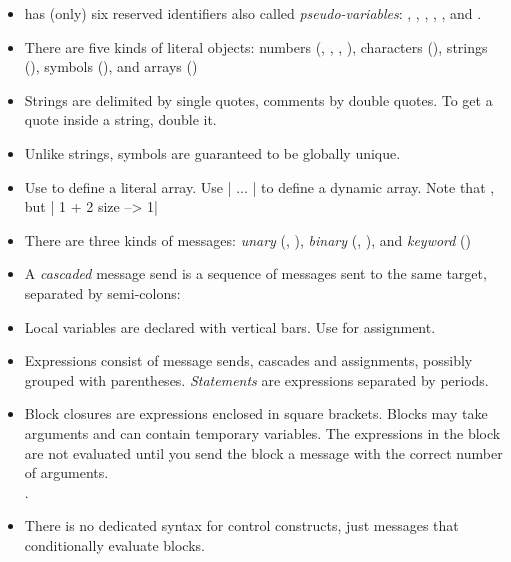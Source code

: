 \documentclass[a4paper,10pt,twoside]{book}
\begin{document}
\begin{itemize}

\item	\pharo has (only) six reserved identifiers also called \textit{pseudo-variables}: , , , , ,  and  .

\item	There are five kinds of literal objects: numbers (, , , ), characters (), strings (), symbols (), and arrays ()

\item	Strings are delimited by single quotes, comments by double quotes.
		To get a quote inside a string, double it.

\item	Unlike strings, symbols are guaranteed to be globally unique.

\item	Use  to define a literal array.
		Use \ct|{ ... }| to define a dynamic array.
		Note that 
		, but 
		\ct|{ 1 + 2 } size --> 1|

\item	There are three kinds of messages:
		\emph{unary} (\eg {}, ),
		\emph{binary} (\eg {}, ), and
		\emph{keyword} (\eg {})

\item	A \emph{cascaded} message send is a sequence of messages sent to the same target, separated by semi-colons:

\item	Local variables are declared with vertical bars.
		Use \ct{:=} for assignment.

\item	Expressions consist of message sends, cascades and assignments, possibly grouped with parentheses.
		\emph{Statements} are expressions separated by periods.

\item	Block closures are expressions enclosed in square brackets.
		Blocks may take arguments and can contain temporary variables.
		The expressions in the block are not evaluated until you send the block a 
		 message with the correct number of arguments.\\
		.

\item	There is no dedicated syntax for control constructs, just messages that conditionally evaluate blocks.\\

\end{itemize}

\ifx\wholebook\relax\else
\end{document}
